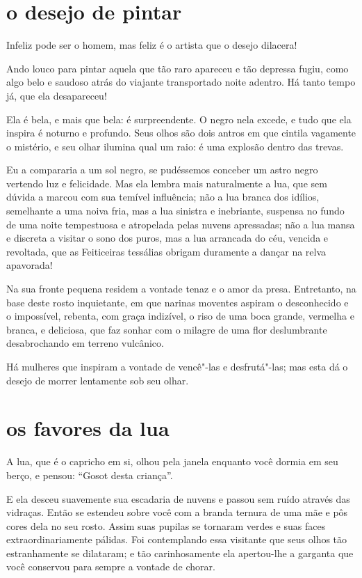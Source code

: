 \quebra\section[O desejo de pintar]{o desejo de pintar}

Infeliz pode ser o homem, mas feliz é o artista que o desejo dilacera!

Ando louco para pintar aquela que tão raro apareceu e tão
depressa fugiu, como algo belo e saudoso atrás do viajante transportado
noite adentro. Há tanto tempo já, que ela desapareceu!

Ela é bela, e mais que bela: é surpreendente. O negro nela excede, e
tudo que ela inspira é noturno e profundo. Seus olhos são dois antros
em que cintila vagamente o mistério, e seu olhar ilumina qual um raio: é
uma explosão dentro das trevas.

Eu a compararia a um sol negro, se pudéssemos conceber um astro negro
vertendo luz e felicidade. Mas ela lembra mais naturalmente a
lua, que sem dúvida a marcou com sua temível influência; não a lua
branca dos idílios, semelhante a uma noiva fria, mas a lua
sinistra e inebriante, suspensa no fundo de uma noite tempestuosa e
atropelada pelas nuvens apressadas; não a lua mansa e discreta a
visitar o sono dos puros, mas a lua arrancada do céu, vencida e
revoltada, que as Feiticeiras tessálias obrigam duramente a dançar
na relva apavorada!

Na sua fronte pequena residem a vontade tenaz e o amor da presa. Entretanto, na base deste rosto inquietante, em que narinas moventes aspiram
o desconhecido e o impossível, rebenta, com graça indizível, o riso de
uma boca grande, vermelha e branca, e deliciosa, que faz sonhar com o
milagre de uma flor deslumbrante desabrochando em terreno vulcânico.

Há mulheres que inspiram a vontade de vencê"-las e desfrutá"-las; mas
esta dá o desejo de morrer lentamente sob seu olhar.

\quebra\section[Os favores da lua]{os favores da lua}

A lua, que é o capricho em si, olhou pela janela enquanto você dormia
em seu berço, e pensou: “Gosot desta criança''.

E ela desceu suavemente sua escadaria de nuvens e passou sem ruído
através das vidraças. Então se estendeu sobre você com a branda ternura 
de uma mãe e pôs cores dela no seu rosto. Assim suas pupilas se
tornaram verdes e suas faces extraordinariamente pálidas. Foi
contemplando essa visitante que seus olhos tão estranhamente se
dilataram; e tão carinhosamente ela apertou-lhe a garganta que você
conservou para sempre a vontade de chorar.

